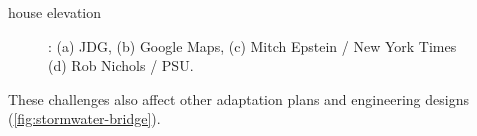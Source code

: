 \begin{block}{house elevation}
\begin{framed}
\begin{figure}
            \hfill%
            \caption{
                : (a) JDG, (b) Google Maps, (c) Mitch Epstein /  New York Times (d) Rob Nichols / PSU.
            }
            \label{fig:images}
        \end{figure}
    \end{framed}
    These challenges also affect other adaptation plans and engineering designs (\cref{fig:stormwater-bridge}).
\end{block}